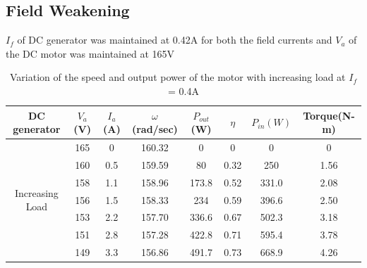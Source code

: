 \documentclass[12pt]{article}
\begin{document}
        \subsection{Field Weakening}
             $I_f$ of DC generator was maintained at 0.42A for both the field currents and $V_a$ of the DC motor was maintained at 165V
                \begin{table}[H]
                    \centering
                    \begin{tabular}{|c|c|c|c|c|c|c|c|}
                         \hline
                         \hline
                        DC generator & $V_a$(V) & $I_a$(A) & $\omega$(rad/sec) & $P_{out}$(W) & $\eta$ & $P_{in}(W)$ & Torque(N-m) \\
                        \hline
                        \multirow{8}{5em}{Increasing Load} & 165 & 0 & 160.32 & 0 & 0 &0&0\\
                                    & 160 & 0.5 & 159.59 & 80 & 0.32 & 250 & 1.56 \\
                                    & 158 & 1.1 & 158.96 & 173.8 & 0.52 & 331.0 & 2.08\\
                                    & 156 & 1.5 & 158.33 & 234 & 0.59 & 396.6 & 2.50\\
                                    & 153 & 2.2 & 157.70 & 336.6 & 0.67 & 502.3 & 3.18\\
                                    & 151 & 2.8 & 157.28 & 422.8 & 0.71 & 595.4 & 3.78\\
                                    & 149 & 3.3 & 156.86 & 491.7 & 0.73 & 668.9 & 4.26\\

                             \hline
                             \hline
                    \end{tabular}
                    \caption{Variation of the speed and output power of the motor with increasing load at $I_f$ = 0.4A}
                    \label{tab:my_label}
                \end{table}
                
\end{document}
